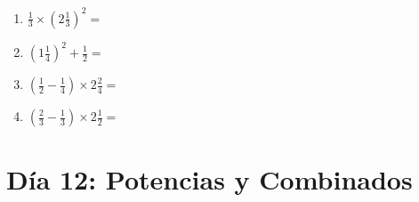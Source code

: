 \documentclass[12pt]{article}
\begin{document}
\begin{enumerate}
\item \large $ \frac{1}{3} \times \left( 2 \frac{1}{3} \right)^2 = $ \vspace{1.6cm}
\item \large $ \left( 1 \frac{1}{4} \right)^2 + \frac{1}{2} = $ \vspace{1.6cm}
\item \large $ \left( \frac{1}{2} - \frac{1}{4} \right) \times 2 \frac{2}{4} = $ \vspace{1.6cm}
\item \large $ \left( \frac{2}{3} - \frac{1}{3} \right) \times 2 \frac{1}{2} = $ \vspace{1.6cm}
\end{enumerate}\newpage
\section*{Día 12: Potencias y Combinados}
\end{document}
